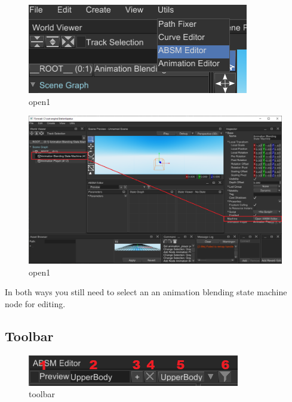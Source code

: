 \documentclass[
]{book}
\theoremstyle{definition}
\theoremstyle{definition}
\theoremstyle{definition}
\theoremstyle{definition}
\theoremstyle{remark}
\begin{document}
\begin{figure}
\centering
\includegraphics{images/animation/absm_open1.png}
\caption{open1}
\end{figure}

\begin{figure}
\centering
\includegraphics{images/animation/absm_open2.png}
\caption{open1}
\end{figure}

In both ways you still need to select an an animation blending state machine node for editing.

\subsection{Toolbar}\label{toolbar-1}

\begin{figure}
\centering
\includegraphics{images/animation/absm_toolbar.png}
\caption{toolbar}
\end{figure}
\end{document}
